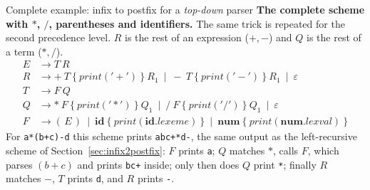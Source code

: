\documentclass[11pt,a4paper]{article}
\newcommand{\at}[2]{\ensuremath{#1.\mathit{#2}}}
\newcommand{\tok}[1]{\ensuremath{\mathtt{#1}}}
\begin{document}
\begin{examplebox}{Complete example: infix to postfix for a \emph{top-down} parser}
\textbf{The complete scheme with $*$, $/$, parentheses and identifiers.} The same trick is repeated for the second precedence level. $R$ is the rest of an expression ($+,-$) and $Q$ is the rest of a term ($*,/$).
\begin{align*}
E &\to T\ R\\
R &\to +\ T\ \{\ \mathit{print}(\tok{'+'})\ \}\ R_1 \ \mid\ -\ T\ \{\ \mathit{print}(\tok{'-'})\ \}\ R_1 \ \mid\ \varepsilon\\
T &\to F\ Q\\
Q &\to *\ F\ \{\ \mathit{print}(\tok{'*'})\ \}\ Q_1 \ \mid\ /\ F\ \{\ \mathit{print}(\tok{'/'})\ \}\ Q_1 \ \mid\ \varepsilon\\
F &\to (\,E\,) \ \mid\ \mathbf{id}\ \{\ \mathit{print}(\at{\mathbf{id}}{lexeme})\ \}\ \mid\ \mathbf{num}\ \{\ \mathit{print}(\at{\mathbf{num}}{lexval})\ \}
\end{align*}
For \texttt{a*(b+c)-d} this scheme prints \texttt{abc+*d-}, the same output as the left-recursive scheme of Section~\ref{sec:infix2postfix}: $F$ prints \texttt{a}; $Q$ matches $*$, calls $F$, which parses $(b+c)$ and prints \texttt{bc+} inside; only then does $Q$ print \texttt{*}; finally $R$ matches $-$, $T$ prints \texttt{d}, and $R$ prints \texttt{-}.
\end{examplebox}
\end{document}
